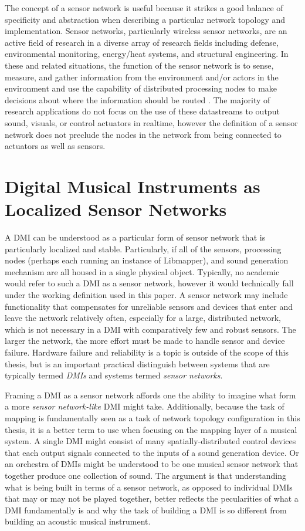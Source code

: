 The concept of a sensor network is useful because it strikes a good balance of specificity and abstraction when describing a particular network topology and implementation. Sensor networks, particularly wireless sensor networks, are an active field of research in a diverse array of research fields including defense, environmental monitoring, energy/heat systems, and structural engineering. In these and related situations, the function of the sensor network is to sense, measure, and gather information from the environment and/or actors in the environment and use the capability of distributed processing nodes to make decisions about where the information should be routed \cite{survey2008}. The majority of research applications do not focus on the use of these datastreams to output sound, visuals, or control actuators in realtime, however the definition of a sensor network does not preclude the nodes in the network from being connected to actuators as well as sensors.

\section{Digital Musical Instruments as Localized Sensor Networks}

A DMI can be understood as a particular form of sensor network that is particularly localized and stable. Particularly, if all of the sensors, processing nodes (perhaps each running an instance of Libmapper), and sound generation mechanism are all housed in a single physical object. Typically, no academic would refer to such a DMI as a sensor network, however it would technically fall under the working definition used in this paper. A sensor network may include functionality that compensates for unreliable sensors and devices that enter and leave the network relatively often, especially for a large, distributed network, which is not necessary in a DMI with comparatively few and robust sensors. The larger the network, the more effort must be made to handle sensor and device failure. Hardware failure and reliability is a topic is outside of the scope of this thesis, but is an important practical distinguish between systems that are typically termed \emph{DMIs} and systems termed \emph{sensor networks}.

Framing a DMI as a sensor network affords one the ability to imagine what form a more \emph{sensor network-like} DMI might take. Additionally, because the task of mapping is fundamentally seen as a task of network topology configuration in this thesis, it is a better term to use when focusing on the mapping layer of a musical system. A single DMI might consist of many spatially-distributed control devices that each output signals connected to the inputs of a sound generation device. Or an orchestra of DMIs might be understood to be one musical sensor network that together produce one collection of sound. The argument is that understanding what is being built in terms of a sensor network, as opposed to individual DMIs that may or may not be played together, better reflects the pecularities of what a DMI fundamentally is and why the task of building a DMI is so different from building an acoustic musical instrument.

